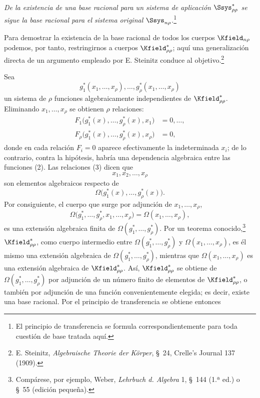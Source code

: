 \documentclass[11pt]{article}
\begin{document}
\emph{De la existencia de una base racional para un sistema de aplicación $\Ssys^*_{\rho\rho}$ se sigue la base racional para el sistema original $\Ssys_{n\rho}$.}\footnote{El principio de transferencia se formula correspondientemente para toda cuestión de base tratada aquí.}

Para demostrar la existencia de la base racional de todos los cuerpos $\Kfield_{n\rho}$ podemos, por tanto, restringirnos a cuerpos $\Kfield^*_{\rho\rho}$; aquí una generalización directa de un argumento empleado por E. Steinitz conduce al objetivo.\footnote{E. Steinitz, \emph{Algebraische Theorie der Körper}, \S\ 24, Crelle's Journal 137 (1909).}

Sea
\begin{equation}
  g_1^*(x_1,\ldots,x_\rho),\ldots,
  g_\rho^*(x_1,\ldots,x_\rho)
\tag{2}
\end{equation}
un sistema de $\rho$ funciones algebraicamente independientes de $\Kfield^*_{\rho\rho}$. Eliminando $x_1,\ldots,x_\rho$ se obtienen $\rho$ relaciones:
\begin{equation}
\begin{aligned}
  F_1\bigl(g_1^*(x),\ldots,g_\rho^*(x),x_1\bigr)&=0,\ldots,\\
  F_\rho\bigl(g_1^*(x),\ldots,g_\rho^*(x),x_\rho\bigr)&=0,
\end{aligned}
\tag{3}
\end{equation}
donde en cada relación $F_i=0$ aparece efectivamente la indeterminada $x_i$; de lo contrario, contra la hipótesis, habría una dependencia algebraica entre las funciones (2). Las relaciones (3) dicen que
\[
  x_1,x_2,\ldots,x_\rho
\]
son elementos algebraicos respecto de
\[
  \Omega\bigl(g_1^*(x),\ldots,g_\rho^*(x)\bigr).
\]
Por consiguiente, el cuerpo que surge por adjunción de $x_1,\ldots,x_\rho$,
\[
  \Omega\bigl(g_1^*,\ldots,g_\rho^*,x_1,
  \ldots,x_\rho\bigr)=\Omega(x_1,
  \ldots,x_\rho),
\]
es una extensión algebraica finita de $\Omega(g_1^*,\ldots,g_\rho^*)$. Por un teorema conocido,\footnote{Compárese, por ejemplo, Weber, \emph{Lehrbuch d. Algebra} 1, \S\ 144 (1.ª ed.) o \S\ 55 (edición pequeña).} $\Kfield^*_{\rho\rho}$, como cuerpo intermedio entre $\Omega(g_1^*,\ldots,g_\rho^*)$ y $\Omega(x_1,\ldots,x_\rho)$, es él mismo una extensión algebraica de $\Omega(g_1^*,\ldots,g_\rho^*)$, mientras que $\Omega(x_1,\ldots,x_\rho)$ es una extensión algebraica de $\Kfield^*_{\rho\rho}$. Así, $\Kfield^*_{\rho\rho}$ se obtiene de $\Omega(g_1^*,\ldots,g_\rho^*)$ por adjunción de un número finito de elementos de $\Kfield^*_{\rho\rho}$, o también por adjunción de una función convenientemente elegida; es decir, existe una base racional. Por el principio de transferencia se obtiene entonces
\end{document}
